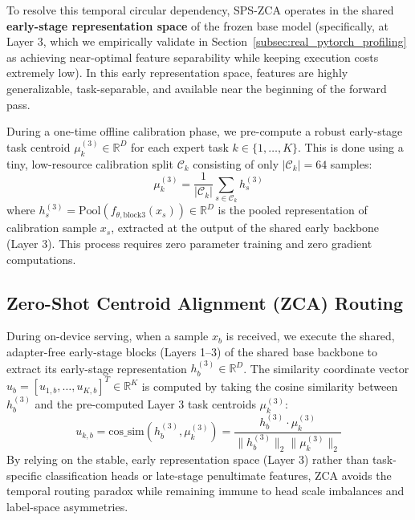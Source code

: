 To resolve this temporal circular dependency, SPS-ZCA operates in the shared \textbf{early-stage representation space} of the frozen base model (specifically, at Layer 3, which we empirically validate in Section~\ref{subsec:real_pytorch_profiling} as achieving near-optimal feature separability while keeping execution costs extremely low). In this early representation space, features are highly generalizable, task-separable, and available near the beginning of the forward pass.

During a one-time offline calibration phase, we pre-compute a robust early-stage task centroid $\mu^{(3)}_k \in \mathbb{R}^D$ for each expert task $k \in \{1, \dots, K\}$. This is done using a tiny, low-resource calibration split $\mathcal{C}_k$ consisting of only $|\mathcal{C}_k| = 64$ samples:
\begin{equation}
    \mu^{(3)}_k = \frac{1}{|\mathcal{C}_k|} \sum_{s \in \mathcal{C}_k} h^{(3)}_s
\end{equation}
where $h^{(3)}_s = \text{Pool}(f_{\theta, \text{block3}}(x_s)) \in \mathbb{R}^D$ is the pooled representation of calibration sample $x_s$, extracted at the output of the shared early backbone (Layer 3). This process requires zero parameter training and zero gradient computations.

\subsection{Zero-Shot Centroid Alignment (ZCA) Routing}
During on-device serving, when a sample $x_b$ is received, we execute the shared, adapter-free early-stage blocks (Layers 1--3) of the shared base backbone to extract its early-stage representation $h^{(3)}_b \in \mathbb{R}^D$.
The similarity coordinate vector $u_b = [u_{1, b}, \dots, u_{K, b}]^T \in \mathbb{R}^K$ is computed by taking the cosine similarity between $h^{(3)}_b$ and the pre-computed Layer 3 task centroids $\mu^{(3)}_k$:
\begin{equation}
    u_{k, b} = \text{cos\_sim}(h^{(3)}_b, \mu^{(3)}_k) = \frac{h^{(3)}_b \cdot \mu^{(3)}_k}{\|h^{(3)}_b\|_2 \|\mu^{(3)}_k\|_2}
\end{equation}
By relying on the stable, early representation space (Layer 3) rather than task-specific classification heads or late-stage penultimate features, ZCA avoids the temporal routing paradox while remaining immune to head scale imbalances and label-space asymmetries.

